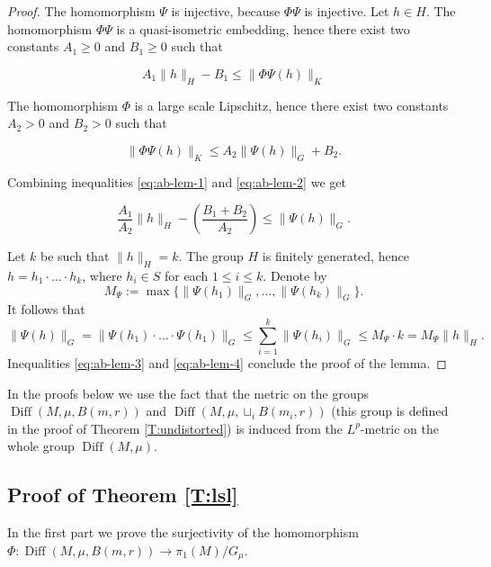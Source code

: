 \documentclass[a4paper,12pt]{amsart}
\def\Diff{\operatorname{Diff}}
\theoremstyle{definition}
\begin{document}
\begin{proof}
The homomorphism $\Psi$ is injective, because $\Phi\Psi$ is
injective. Let $h\in H$. The homomorphism $\Phi\Psi$ is a
quasi-isometric embedding, hence there exist two constants $A_1\geq0$
and $B_1\geq0$ such that

\begin{equation}\label{eq:ab-lem-1}
A_1\|h\|_H-B_1\leq\|\Phi\Psi(h)\|_K
\end{equation}

The homomorphism $\Phi$ is a large scale Lipschitz, hence there exist
two constants $A_2>0$ and $B_2>0$ such that

\begin{equation}\label{eq:ab-lem-2}
\|\Phi\Psi(h)\|_K\leq A_2\|\Psi(h)\|_G+B_2.
\end{equation}

Combining inequalities \eqref{eq:ab-lem-1} and \eqref{eq:ab-lem-2} we get

\begin{equation}\label{eq:ab-lem-3}
\frac{A_1}{A_2}\|h\|_H-\left(\frac{B_1+B_2}{A_2}\right)\leq\|\Psi(h)\|_G.
\end{equation}

Let $k$ be such that $\|h\|_H=k$. The group $H$ is finitely generated,
hence $h=h_1\cdot\ldots\cdot h_k$, where $h_i\in S$ for each
$1\leq i\leq k$.  Denote by
$$M_\Psi:=\max\{\|\Psi(h_1)\|_G,\ldots,\|\Psi(h_k)\|_G\}.$$
It follows that
\begin{equation}\label{eq:ab-lem-4}
\|\Psi(h)\|_G=
\|\Psi(h_1)\cdot\ldots\cdot\Psi(h_1)\|_G\leq\sum\limits_{i=1}^k\|\Psi(h_i)\|_G\leq M_\Psi\cdot k
=M_\Psi\|h\|_H.
\end{equation}
Inequalities \eqref{eq:ab-lem-3} and \eqref{eq:ab-lem-4} conclude the proof of the lemma.
\end{proof}


In the proofs below we use the fact that the metric on the groups $\Diff(M,\mu, B(m,r))$ and $\Diff(M,\mu, \sqcup_i B(m_i,r))$
(this group is defined in the proof of Theorem \ref{T:undistorted}) is induced from the $L^p$-metric on the whole group $\Diff(M,\mu)$.


\subsection{Proof of Theorem \ref{T:lsl}}\label{SS:proof_lsl}
In the first part we prove the surjectivity of the homomorphism
$\Phi\colon \Diff(M,\mu,B(m,r)) \to \pi_1(M)/G_\mu$.
\end{document}
